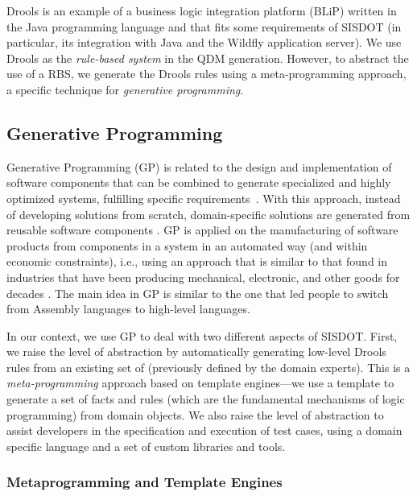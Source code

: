 Drools is an example of a business logic integration platform (BLiP) written in the Java programming language and that fits some requirements of SISDOT (in particular, its integration with Java and the Wildfly application server). We use Drools as the \emph{rule-based system} in the QDM generation. However, to abstract the use of a RBS, we generate the Drools rules using a meta-programming approach, a specific technique for \emph{generative programming}. 




\subsection{Generative Programming}
\label{sec:gp}

Generative Programming (GP) is related to the design and implementation of software components that can be combined to generate specialized and highly optimized systems, fulfilling specific requirements~\cite{DBLP:phd/dnb/Czarnecki99}. With this approach, instead of developing solutions from scratch, domain-specific solutions are generated from reusable software components \cite{arora2009}. GP is applied on the manufacturing of software products from components in a system in an automated way (and within economic constraints), i.e., using an approach that is similar to that found in industries that have been producing mechanical, electronic, and other goods for decades \cite{barth2002}. The main idea in GP is similar to the one that led people to switch from Assembly languages to high-level languages. 

In our context, we use GP to deal with two different aspects of SISDOT. First, we raise the level of abstraction by automatically generating low-level Drools rules from an existing set of \callers (previously defined by the domain experts). This is a \emph{meta-programming} approach based on template engines---we use a template to generate a set of facts and rules (which are the fundamental mechanisms of logic programming) from domain objects. We also raise the level of abstraction to assist developers in the specification and execution of test cases, using a domain specific language and a set of custom libraries and tools.  


\subsubsection{Metaprogramming and Template Engines}

